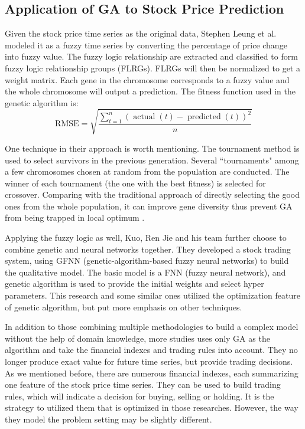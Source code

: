 \documentclass{article}
\begin{document}
\subsection{Application of GA to Stock Price Prediction}

Given the stock price time series as the original data,
Stephen Leung et al. \cite{a-novel-stock-forecasting-model-based-on-fuzzy-time-series}
modeled it as a fuzzy time series
by converting the percentage of price change into fuzzy value.
The fuzzy logic relationship are extracted and classified to form fuzzy logic relationship groups (FLRGs).
FLRGs will then be normalized to get a weight matrix.
Each gene in the chromosome corresponds to a fuzzy value
and the whole chromosome will output a prediction.
The fitness function used in the genetic algorithm is:
$$
\text{RMSE} =
\sqrt{ \dfrac {\sum \limits_{t=1}^{n}\left(\operatorname{actual}(t) - \operatorname{predicted}(t)\right)^2 } {n}}
$$

One technique in their approach is worth mentioning.
The tournament method is used to select survivors in the previous generation.
Several ``tournaments" among a few chromosomes chosen at random from the population are conducted.
The winner of each tournament (the one with the best fitness) is selected for crossover.
Comparing with the traditional approach of directly selecting the good ones from the whole population,
it can improve gene diversity thus prevent GA from being trapped in local optimum
\cite{a-note-on-boltzmann-tournament-selecttion}.

Applying the fuzzy logic as well, Kuo, Ren Jie and his team \cite{an-intelligent-stock-trading-decision-support-system}
further choose to combine genetic and neural networks together.
They developed a stock trading system, using GFNN (genetic-algorithm-based fuzzy neural networks)
to build the qualitative model.
The basic model is a FNN (fuzzy neural network), and
genetic algorithm is used to provide the initial weights and select hyper parameters.
This research and some similar ones utilized the optimization feature of genetic algorithm,
but put more emphasis on other techniques.

In addition to those combining multiple methodologies to build a complex model
without the help of domain knowledge,
more studies uses only GA as the algorithm and take the financial indexes and trading rules into account.
They no longer produce exact value for future time series, but provide trading decisions.
As we mentioned before, there are numerous financial indexes,
each summarizing one feature of the stock price time series.
They can be used to build trading rules, which will indicate a decision for buying, selling or holding.
It is the strategy to utilized them that is optimized in those researches.
However, the way they model the problem setting may be slightly different.
\end{document}
